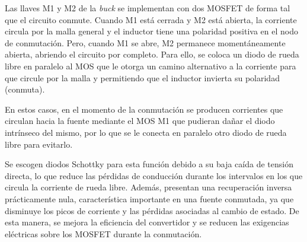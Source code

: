 Las llaves M1 y M2 de la \textit{buck} se implementan con dos MOSFET de forma tal que el circuito conmute. Cuando M1 está cerrada y M2 está abierta, la corriente circula por la malla general y el inductor tiene una polaridad positiva en el nodo de conmutación. Pero, cuando M1 se abre, M2 permanece momentáneamente abierta, abriendo el circuito por completo. Para ello, se coloca un diodo de rueda libre en paralelo al MOS que le otorga un camino alternativo a la corriente para que circule por la malla y permitiendo que el inductor invierta su polaridad (conmuta).

En estos casos, en el momento de la conmutación se producen corrientes que circulan hacia la fuente mediante el MOS M1 que pudieran dañar el diodo intrínseco del mismo, por lo que se le conecta en paralelo otro diodo de rueda libre para evitarlo.

Se escogen diodos Schottky para esta función debido a su baja caída de tensión directa, lo que reduce las pérdidas de conducción durante los intervalos en los que circula la corriente de rueda libre. Además, presentan una recuperación inversa prácticamente nula, característica importante en una fuente conmutada, ya que disminuye los picos de corriente y las pérdidas asociadas al cambio de estado. De esta manera, se mejora la eficiencia del convertidor y se reducen las exigencias eléctricas sobre los MOSFET durante la conmutación.
